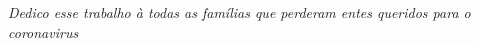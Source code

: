 \begin{dedicatoria}
   \vspace*{\fill}
   \centering
   \noindent
   \textit{Dedico esse trabalho à todas as famílias que perderam entes queridos para o coronavirus}\vspace*{\fill}
\end{dedicatoria}

\begin{resumo}[Agradecimentos]
\end{resumo}



